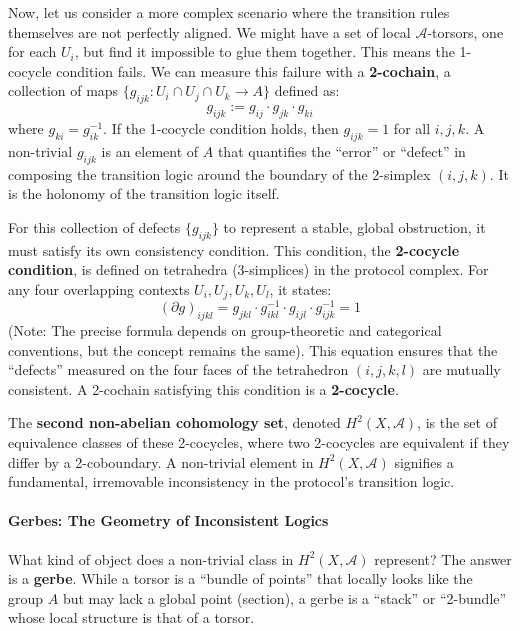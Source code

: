 \documentclass[
]{article}
\begin{document}
Now, let us consider a more complex scenario where the transition rules
themselves are not perfectly aligned. We might have a set of local
\(\mathcal{A}\)-torsors, one for each \(U_i\), but find it impossible to
glue them together. This means the 1-cocycle condition fails. We can
measure this failure with a \textbf{2-cochain}, a collection of maps
\(\{g_{ijk}: U_i \cap U_j \cap U_k \to A\}\) defined as:
\[g_{ijk} := g_{ij} \cdot g_{jk} \cdot g_{ki}\] where
\(g_{ki} = g_{ik}^{-1}\). If the 1-cocycle condition holds, then
\(g_{ijk} = 1\) for all \(i,j,k\). A non-trivial \(g_{ijk}\) is an
element of \(A\) that quantifies the ``error'' or ``defect'' in
composing the transition logic around the boundary of the 2-simplex
\((i,j,k)\). It is the holonomy of the transition logic itself.

For this collection of defects \(\{g_{ijk}\}\) to represent a stable,
global obstruction, it must satisfy its own consistency condition. This
condition, the \textbf{2-cocycle condition}, is defined on tetrahedra
(3-simplices) in the protocol complex. For any four overlapping contexts
\(U_i, U_j, U_k, U_l\), it states:
\[(\partial g)_{ijkl} = g_{jkl} \cdot g_{ikl}^{-1} \cdot g_{ijl} \cdot g_{ijk}^{-1} = 1\]
(Note: The precise formula depends on group-theoretic and categorical
conventions, but the concept remains the same). This equation ensures
that the ``defects'' measured on the four faces of the tetrahedron
\((i,j,k,l)\) are mutually consistent. A 2-cochain satisfying this
condition is a \textbf{2-cocycle}.

The \textbf{second non-abelian cohomology set}, denoted
\(H^2(X, \mathcal{A})\), is the set of equivalence classes of these
2-cocycles, where two 2-cocycles are equivalent if they differ by a
2-coboundary. A non-trivial element in \(H^2(X, \mathcal{A})\) signifies
a fundamental, irremovable inconsistency in the protocol's transition
logic.

\paragraph{Gerbes: The Geometry of Inconsistent
Logics}\label{gerbes-the-geometry-of-inconsistent-logics}

What kind of object does a non-trivial class in \(H^2(X, \mathcal{A})\)
represent? The answer is a \textbf{gerbe}. While a torsor is a ``bundle
of points'' that locally looks like the group \(A\) but may lack a
global point (section), a gerbe is a ``stack'' or ``2-bundle'' whose
local structure is that of a torsor.
\end{document}
